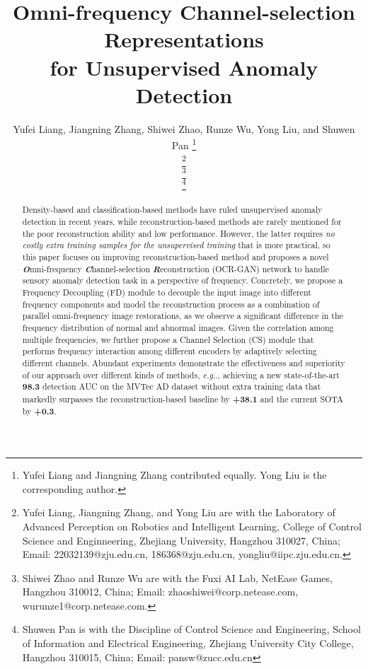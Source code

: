 \documentclass[lettersize,journal]{IEEEtran}
\makeatletter
\DeclareRobustCommand\onedot{\futurelet\@let@token\@onedot}
\def\@onedot{\ifx\@let@token.\else.\null\fi\xspace}
\def\eg{\emph{e.g}\onedot} \def\Eg{\emph{E.g}\onedot}
\makeatother
\begin{document}
\title{Omni-frequency Channel-selection Representations \\for Unsupervised Anomaly Detection}

\author{Yufei Liang, Jiangning Zhang, Shiwei Zhao, Runze Wu, Yong Liu, and Shuwen Pan
\thanks{Yufei Liang and Jiangning Zhang contributed equally. Yong Liu is the corresponding author.}

\thanks{Yufei Liang, Jiangning Zhang, and Yong Liu are with the Laboratory of Advanced Perception on Robotics and Intelligent Learning, College of Control Science and Enginneering, Zhejiang University, Hangzhou 310027, China; Email: 22032139@zju.edu.cn, 186368@zju.edu.cn, yongliu@iipc.zju.edu.cn.}

\thanks{Shiwei Zhao and Runze Wu are with the Fuxi AI Lab, NetEase Games, Hangzhou 310012, China; Email: zhaoshiwei@corp.netease.com, wurunze1@corp.netease.com.}

\thanks{Shuwen Pan is with the Discipline of Control Science and Engineering, School of Information and Electrical Engineering, Zhejiang University City College, Hangzhou 310015, China; Email: pansw@zucc.edu.cn}

}





\maketitle

\begin{abstract}
Density-based and classification-based methods have ruled unsupervised anomaly detection in recent years, while reconstruction-based methods are rarely mentioned for the poor reconstruction ability and low performance. However, the latter requires \emph{no costly extra training samples for the unsupervised training} that is more practical, so this paper focuses on improving reconstruction-based method and proposes a novel \textit{\textbf{O}}mni-frequency \textit{\textbf{C}}hannel-selection \textit{\textbf{R}}econstruction (OCR-GAN) network to handle sensory anomaly detection task in a perspective of frequency. Concretely, we propose a Frequency Decoupling (FD) module to decouple the input image into different frequency components and model the reconstruction process as a combination of parallel omni-frequency image restorations, as we observe a significant difference in the frequency distribution of normal and abnormal images. Given the correlation among multiple frequencies, we further propose a Channel Selection (CS) module that performs frequency interaction among different encoders by adaptively selecting different channels. Abundant experiments demonstrate the effectiveness and superiority of our approach over different kinds of methods, \eg, achieving a new state-of-the-art \textbf{98.3} detection AUC on the MVTec AD dataset without extra training data that markedly surpasses the reconstruction-based baseline by \textbf{+38.1} and the current SOTA by \textbf{+0.3}. 
\end{abstract}
\end{document}
